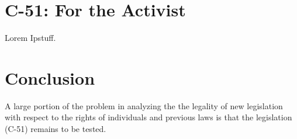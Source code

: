 \documentclass[a4paper, 11pt]{article} %
\begin{document}
\section*{C-51: For the Activist}
Lorem Ipstuff.


\section*{Conclusion}
A large portion of the problem in analyzing the the legality of new legislation with respect to the rights of individuals and previous laws is that the legislation (C-51) remains to be tested.







\end{document}
